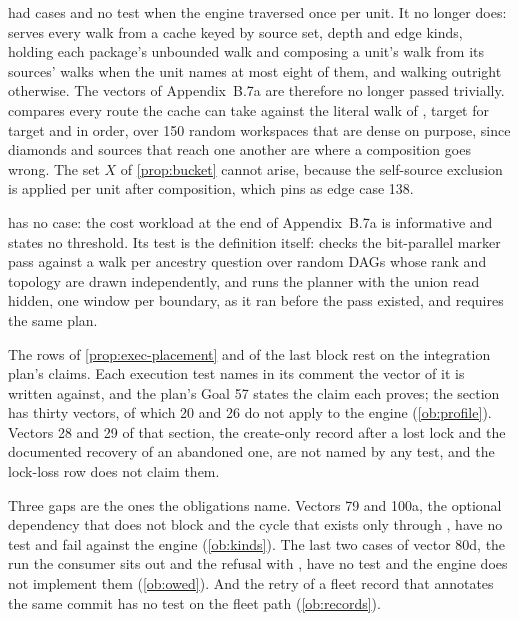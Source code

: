  had cases and no test when the engine traversed once per
unit. It no longer does:  serves every walk from a cache
keyed by source set, depth and edge kinds, holding each package's unbounded
walk and composing a unit's walk from its sources' walks when the unit names
at most eight of them, and walking outright otherwise. The vectors of
Appendix~B.7a are therefore no longer passed trivially.
 compares every route the cache can
take against the literal walk of , target for target and in order,
over 150 random workspaces that are dense on purpose, since diamonds and
sources that reach one another are where a composition goes wrong. The set
$X$ of \cref{prop:bucket} cannot arise, because the self-source exclusion is
applied per unit after composition, which
 pins as edge case 138.

 has no case: the cost workload at the end of
Appendix~B.7a is informative and states no threshold. Its test is the
definition itself:  checks the
bit-parallel marker pass against a walk per ancestry question over random
DAGs whose rank and topology are drawn independently, and
 runs the planner with the
union read hidden, one window per boundary, as it ran before the pass
existed, and requires the same plan.

The rows of \cref{prop:exec-placement} and of the last block rest on
the integration plan's claims. Each execution test names in its comment the
vector of  it is written against, and the plan's Goal 57 states
the claim each proves; the section has thirty vectors, of which 20 and 26 do
not apply to the engine (\cref{ob:profile}). Vectors 28 and 29 of that
section, the create-only record after a lost lock and the documented
recovery of an abandoned one, are not named by any test, and the lock-loss
row does not claim them.

Three gaps are the ones the obligations name. Vectors 79 and 100a, the
optional dependency that does not block and the cycle that exists only
through , have no test and fail against the engine
(\cref{ob:kinds}). The last two cases of vector 80d, the run the consumer
sits out and the refusal with , have no test and the engine does
not implement them (\cref{ob:owed}). And the retry of a fleet record that
annotates the same commit has no test on the fleet path
(\cref{ob:records}).

